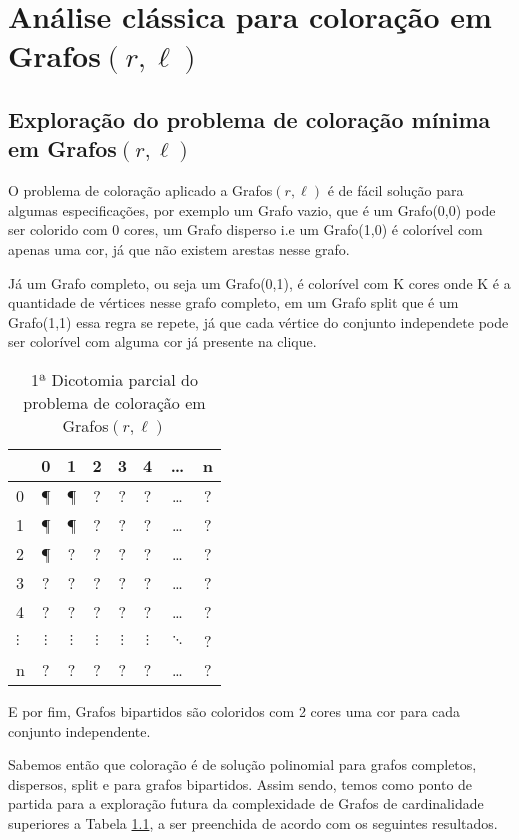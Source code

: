 \chapter{Análise clássica para coloração em Grafos$(r,\ell)$}

\section{Exploração do problema de coloração mínima em Grafos$(r,\ell)$}
O problema de coloração aplicado a Grafos$(r,\ell)$ é de fácil solução para algumas especificações,
por exemplo um Grafo vazio, que é um Grafo(0,0) pode ser colorido com 0 cores, um Grafo disperso i.e um Grafo(1,0) é colorível com apenas uma cor, já que não existem arestas nesse grafo.

Já um Grafo completo, ou seja um Grafo(0,1), é colorível com K cores onde K é a quantidade de vértices nesse grafo completo, em um Grafo split que é um Grafo(1,1) essa regra se repete, já que cada vértice do conjunto independete pode ser colorível com alguma cor já presente na clique.

\begin{table}[!htb]
	\center
	\begin{tabular}{l|*{7}c}
		\toprule
		\backslashbox{$r$}{$l$} & 0 & 1 & 2 & 3 & 4 & \ldots & n\\
		\midrule
		0 & \P & \P & ? & ? & ? & \ldots & ?\\
		1 & \P & \P & ? & ? & ? & \ldots & ?\\
		2 & \P & ? & ? & ? & ? & \ldots & ?\\
		3 & ? & ? & ? & ? & ? & \ldots & ?\\
		4 & ? & ? & ? & ? & ? & \ldots & ?\\
		$\vdots$ & $\vdots$ & $\vdots$ & $\vdots$ & $\vdots$ & $\vdots$ & $\ddots$ & ?\\
		n & ? & ? & ? & ? & ? & \ldots & ?\\
		\bottomrule
	\end{tabular}%
	\caption{1ª Dicotomia parcial do problema de coloração em Grafos$(r,\ell)$}
	\label{tab:tabela_part1dictrl}%
\end{table}%

E por fim, Grafos bipartidos são coloridos com 2 cores uma cor para cada conjunto independente.

Sabemos então que coloração é de solução polinomial para grafos completos, dispersos, split e para grafos bipartidos. Assim sendo, temos como ponto de partida para a exploração futura da complexidade de Grafos de cardinalidade superiores a Tabela \ref{tab:tabela_part1dictrl}, a ser preenchida de acordo com os seguintes resultados.

